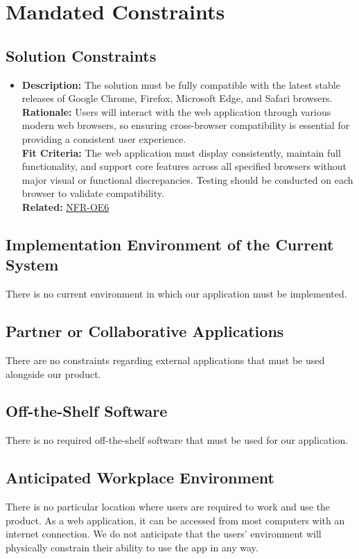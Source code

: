 \documentclass[12pt]{article}
\begin{document}
\section{Mandated Constraints}
\subsection{Solution Constraints}
\begin{itemize}
  \item \textbf{Description:} The solution must be fully compatible with the latest stable releases of Google Chrome, Firefox, Microsoft Edge, and Safari browsers.\\ \textbf{Rationale:} Users will interact with the web application through various modern web browsers, so ensuring cross-browser compatibility is essential for providing a consistent user experience. \\ \textbf{Fit Criteria:} The web application must display consistently, maintain full functionality, and support core features across all specified browsers without major visual or functional discrepancies. Testing should be conducted on each browser to validate compatibility. \\ \textbf{Related:}  \hyperref[sec:OE6]{NFR-OE6}
\end{itemize}
\subsection{Implementation Environment of the Current System}
There is no current environment in which our application must be implemented.
\subsection{Partner or Collaborative Applications}
There are no constraints regarding external applications that must be used alongside our product.
\subsection{Off-the-Shelf Software}
There is no required off-the-shelf software that must be used for our application.
\subsection{Anticipated Workplace Environment}
There is no particular location where users are required to work and use the product. As a web application, it can be accessed from most computers with an internet connection. We do not anticipate that the users' environment will physically constrain their ability to use the app in any way.
\end{document}
